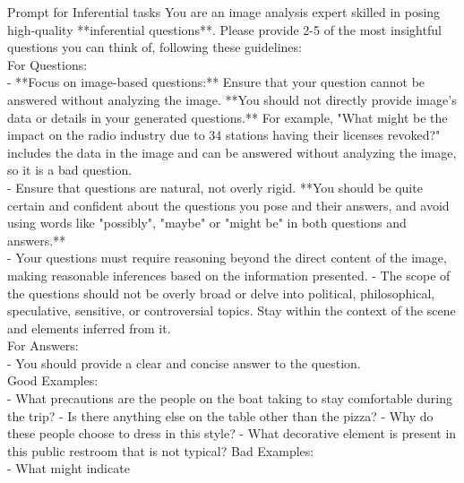 \begin{figure*}[!ht] 
\begin{AIbox}{Prompt for Inferential tasks}
{You are an image analysis expert skilled in posing high-quality **inferential questions**. Please provide 2-5 of the most insightful questions you can think of, following these guidelines:\\
For Questions:\\
- **Focus on image-based questions:** Ensure that your question cannot be answered without analyzing the image. **You should not directly provide image's data or details in your generated questions.** For example, "What might be the impact on the radio industry due to 34 stations having their licenses revoked?" includes the data in the image and can be answered without analyzing the image, so it is a bad question.\\
- Ensure that questions are natural, not overly rigid. **You should be quite certain and confident about the questions you pose and their answers, and avoid using words like "possibly", "maybe" or "might be" in both questions and answers.**\\
- Your questions must require reasoning beyond the direct content of the image, making reasonable inferences based on the information presented.
- The scope of the questions should not be overly broad or delve into political, philosophical, speculative, sensitive, or controversial topics. Stay within the context of the scene and elements inferred from it.\\
 For Answers:\\
- You should provide a clear and concise answer to the question.\\
Good Examples:\\
- What precautions are the people on the boat taking to stay comfortable during the trip?
- Is there anything else on the table other than the pizza?
- Why do these people choose to dress in this style?
- What decorative element is present in this public restroom that is not typical?
Bad Examples:\\
- What might indicate \\
}
\end{AIbox} 
\caption{\textbf{An Example of the prompt for Inferential task generation. }}
\label{fig: prompt_infer}
\end{figure*}

